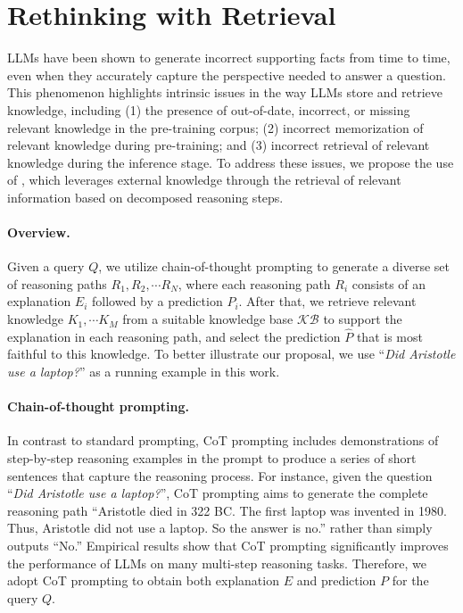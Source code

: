 \section{Rethinking with Retrieval}
\label{sec:framework}

LLMs have been shown to generate incorrect supporting facts from time to time, even when they accurately capture the perspective needed to answer a question. This phenomenon highlights intrinsic issues in the way LLMs store and retrieve knowledge, including (1) the presence of out-of-date, incorrect, or missing relevant knowledge in the pre-training corpus; (2) incorrect memorization of relevant knowledge during pre-training; and (3) incorrect retrieval of relevant knowledge during the inference stage. To address these issues, we propose the use of \NAME{}, which leverages external knowledge through the retrieval of relevant information based on decomposed reasoning steps.

\paragraph{Overview.} Given a query $Q$, we utilize chain-of-thought prompting to generate a diverse set of reasoning paths $R_1, R_2, \cdots R_N$, where each reasoning path $R_i$ consists of an explanation $E_i$ followed by a prediction $P_i$. After that, we retrieve relevant knowledge $K_1, \cdots K_M$ from a suitable knowledge base $\mathcal{KB}$ to support the explanation in each reasoning path, and select the prediction $\hat{P}$ that is most faithful to this knowledge. To better illustrate our proposal, we use ``\textit{Did Aristotle use a laptop?}'' as a running example in this work.

\paragraph{Chain-of-thought prompting.}  In contrast to standard prompting, CoT prompting \cite{wei2022chain} includes demonstrations of step-by-step reasoning examples in the prompt
to produce a series of short sentences that capture the reasoning process. For instance, given the question ``\textit{Did Aristotle use a laptop?}'', CoT prompting aims to generate the complete reasoning path ``Aristotle died in 322 BC. The first laptop was invented in 1980. Thus, Aristotle did not use a laptop. So the answer is no.'' rather than simply outputs ``No.'' Empirical results show that CoT prompting significantly improves the performance of LLMs on many multi-step reasoning tasks. Therefore, we adopt CoT prompting to obtain both explanation $E$ and prediction $P$ for the query $Q$. 

